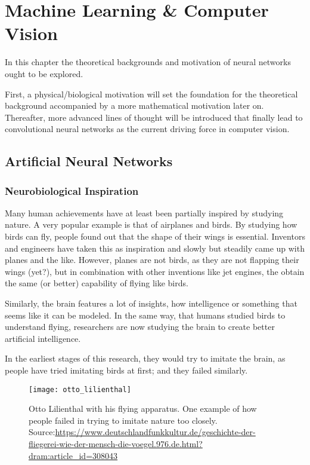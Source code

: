 \setchapterpreamble[u]{\margintoc}
\chapter{Machine Learning \& Computer Vision}
In this chapter the theoretical backgrounds and motivation of neural networks ought to be explored.

First, a physical/biological motivation will set the foundation for the theoretical background accompanied by a more mathematical motivation later on.
Thereafter, more advanced lines of thought will be introduced that finally lead to convolutional neural networks as the current driving force in computer vision.

\section{Artificial Neural Networks}

\subsection[Inspiration]{Neurobiological Inspiration}

Many human achievements have at least been partially inspired by studying nature.
A very popular example is that of airplanes and birds.
By studying how birds can fly, people found out that the shape of their wings is essential.
Inventors and engineers have taken this as inspiration and slowly but steadily came up with planes and the like.
However, planes are not birds, as they are not flapping their wings (yet?), but in combination with other inventions like jet engines, the obtain the same (or better) capability of flying like birds.

Similarly, the brain features a lot of insights, how intelligence or something that seems like it can be modeled.
In the same way, that humans studied birds to understand flying, researchers are now studying the brain to create better artificial intelligence.

In the earliest stages of this research, they would try to imitate the brain, as people have tried imitating birds at first; and they failed similarly.
\begin{figure}
    \texttt{[image: otto\_lilienthal]}
    \caption{Otto Lilienthal with his flying apparatus. One example of how people failed in trying to imitate nature too closely. Source:\url{https://www.deutschlandfunkkultur.de/geschichte-der-fliegerei-wie-der-mensch-die-voegel.976.de.html?dram:article_id=308043}}
\end{figure}

